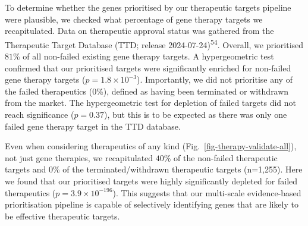 \documentclass[
]{article}
\begin{document}
To determine whether the genes prioritised by our therapeutic targets
pipeline were plausible, we checked what percentage of gene therapy
targets we recapitulated. Data on therapeutic approval status was
gathered from the Therapeutic Target Database (TTD; release
2024-07-24)\textsuperscript{54}. Overall, we prioritised \(81\)\% of all
non-failed existing gene therapy targets. A hypergeometric test
confirmed that our prioritised targets were significantly enriched for
non-failed gene therapy targets (\(p=\)\(1.8 \times 10^{-3}\)).
Importantly, we did not prioritise any of the failed therapeutics (0\%),
defined as having been terminated or withdrawn from the market. The
hypergeometric test for depletion of failed targets did not reach
significance (\(p=\)\(0.37\)), but this is to be expected as there was
only one failed gene therapy target in the TTD database.

Even when considering therapeutics of any kind
(Fig.~\ref{fig-therapy-validate-all}), not just gene therapies, we
recapitulated \(40\)\% of the non-failed therapeutic targets and 0\% of
the terminated/withdrawn therapeutic targets (n=1,255). Here we found
that our prioritised targets were highly significantly depleted for
failed therapeutics (\(p=\)\(3.9 \times 10^{-196}\)). This suggests that
our multi-scale evidence-based prioritisation pipeline is capable of
selectively identifying genes that are likely to be effective
therapeutic targets.

\begin{figure}[H]


\caption{\label{fig-therapy-validate}}

\end{figure}%
\end{document}
